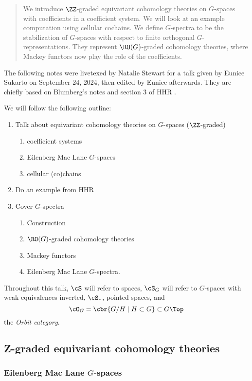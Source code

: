 \begin{abstract}
  We introduce $\ZZ$-graded equivariant cohomology theories on $G$-spaces with coefficients in a coefficient system. 
  We will look at an example computation using cellular cochains. 
  We define $G$-spectra to be the stabilization of $G$-spaces with respect to finite orthogonal $G$-representations. They represent $\RO(G)$-graded cohomology theories, where Mackey functors now play the role of the coefficients. 
\end{abstract}

The following notes were livetexed by Natalie Stewart for a talk given by Eunice Sukarto on September 24, 2024, then edited by Eunice afterwards.
They are chiefly based on Blumberg's notes \cite{burnside} and section 3 of HHR \cite{HHR}.

We will follow the following outline:
\begin{enumerate}
  \item Talk about equivariant cohomology theories on $G$-spaces ($\ZZ$-graded)
    \begin{enumerate}
      \item coefficient systems
      \item Eilenberg Mac Lane $G$-spaces
      \item cellular (co)chains
    \end{enumerate}
  \item Do an example from HHR
  \item Cover $G$-spectra
    \begin{enumerate}
      \item Construction
      \item $\RO(G)$-graded cohomology theories
      \item Mackey functors
      \item Eilenberg Mac Lane $G$-spectra.
    \end{enumerate}
\end{enumerate}

Throughout this talk, $\cS$ will refer to spaces, $\cS_G$ will refer to $G$-spaces with weak equivalences inverted, $\cS_*$, pointed spaces, and
\[
  \cO_G = \cbr{G/H \mid H \subset G} \subset G\Top
\]
the \emph{Orbit category}.

\subsection{Z-graded equivariant cohomology theories}%
\subsubsection{Eilenberg Mac Lane $G$-spaces}%

